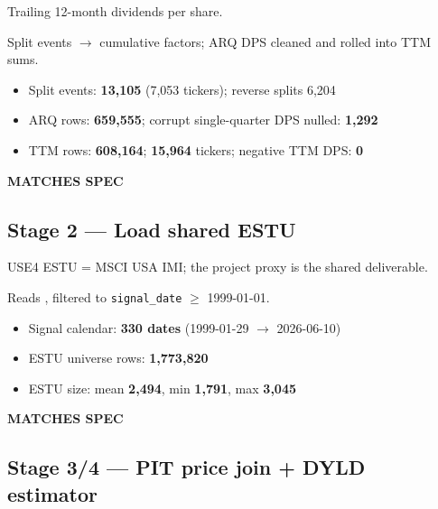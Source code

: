 \documentclass[11pt,a4paper]{article}
\newcommand{\PASS}[1]{\textcolor{pass}{\textbf{#1}}}
\begin{document}
\begin{description}[style=nextline]
  \item[PDF SPEC] Trailing 12-month dividends per share.
  \item[Implementation] Split events $\to$ cumulative factors; ARQ DPS cleaned and rolled into TTM sums.
  \item[Observed]\phantom{x}
    \begin{itemize}[nosep, topsep=-\parskip]
      \item Split events: \textbf{13{,}105} (7{,}053 tickers); reverse splits 6{,}204
      \item ARQ rows: \textbf{659{,}555}; corrupt single-quarter DPS nulled: \textbf{1{,}292}
      \item TTM rows: \textbf{608{,}164}; \textbf{15{,}964} tickers; negative TTM DPS: \textbf{0}
    \end{itemize}
  \item[Status] \PASS{MATCHES SPEC}
\end{description}

\subsection{Stage 2 --- Load shared ESTU}

\begin{description}[style=nextline]
  \item[PDF SPEC] USE4 ESTU = MSCI USA IMI; the project proxy is the shared  deliverable.
  \item[Implementation] Reads , filtered to \texttt{signal\_date} $\geq$ 1999-01-01.
  \item[Observed]\phantom{x}
    \begin{itemize}[nosep, topsep=-\parskip]
      \item Signal calendar: \textbf{330 dates} (1999-01-29 $\to$ 2026-06-10)
      \item ESTU universe rows: \textbf{1{,}773{,}820}
      \item ESTU size: mean \textbf{2{,}494}, min \textbf{1{,}791}, max \textbf{3{,}045}
    \end{itemize}
  \item[Status] \PASS{MATCHES SPEC}
\end{description}

\subsection{Stage 3/4 --- PIT price join + DYLD estimator}
\end{document}
